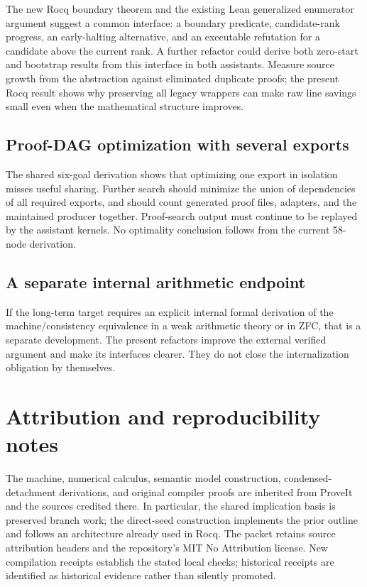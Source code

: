 \documentclass[11pt,letterpaper]{article}
\newcommand{\code}[1]{\texttt{\detokenize{#1}}}
\begin{document}
The new Rocq boundary theorem and the existing Lean generalized enumerator
argument suggest a common interface: a boundary predicate, candidate-rank
progress, an early-halting alternative, and an executable refutation for a
candidate above the current rank. A further refactor could derive both zero-start
and bootstrap results from this interface in both assistants. Measure source
growth from the abstraction against eliminated duplicate proofs; the present
Rocq result shows why preserving all legacy wrappers can make raw line savings
small even when the mathematical structure improves.

\subsection{Proof-DAG optimization with several exports}

The shared six-goal derivation shows that optimizing one export in isolation
misses useful sharing. Further search should minimize the union of dependencies
of all required exports, and should count generated proof files, adapters, and
the maintained producer together. Proof-search output must continue to be
replayed by the assistant kernels. No optimality conclusion follows from the
current 58-node derivation.

\subsection{A separate internal arithmetic endpoint}

If the long-term target requires an explicit internal formal derivation of the
machine/consistency equivalence in a weak arithmetic theory or in ZFC, that is
a separate development. The present refactors improve the external verified
argument and make its interfaces clearer. They do not close the internalization
obligation by themselves.

\section*{Attribution and reproducibility notes}

The machine, numerical calculus, semantic model construction, condensed-detachment
derivations, and original compiler proofs are inherited from ProveIt and the
sources credited there. In particular, the shared implication basis is preserved
branch work; the direct-seed construction implements the prior
\code{sharing-interfaces} outline and follows an architecture already used in
Rocq. The packet retains source attribution headers and the repository's MIT
No Attribution license. New compilation receipts establish the stated local
checks; historical receipts are identified as historical evidence rather than
silently promoted.
\end{document}
